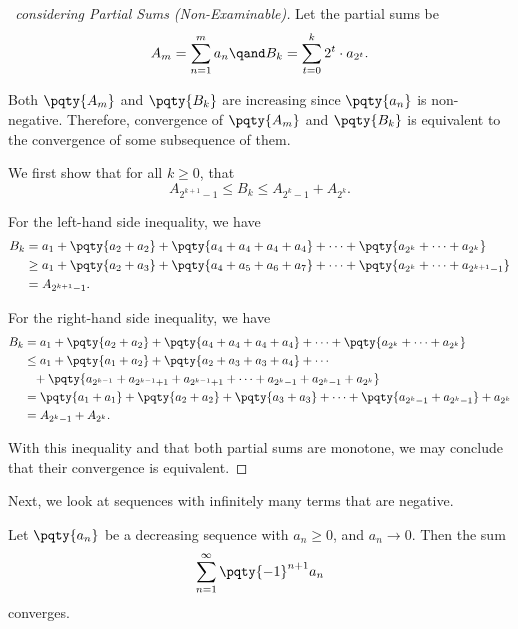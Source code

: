 \begin{proof}[\proofname\ considering Partial Sums (Non-Examinable)]
    Let the partial sums be
        \[
            A_m = \sum_{n = 1}^{m} a_n \qand B_k = \sum_{t = 0}^{k} 2^t \cdot a_{2^t}.
        \]

        Both \(\pqty{A_m}\) and \(\pqty{B_k}\) are increasing since \(\pqty{a_n}\) is non-negative. Therefore, convergence of \(\pqty{A_m}\) and \(\pqty{B_k}\) is equivalent to the convergence of some subsequence of them.

        We first show that for all \(k \geq 0\), that
        \[
            A_{2^{k + 1} - 1} \leq B_{k} \leq A_{2^k - 1} + A_{2^k}.
        \]

        For the left-hand side inequality, we have
        \begin{align*}
            B_k &= a_1 + \pqty{a_2 + a_2} + \pqty{a_4 + a_4 + a_4 + a_4} + \cdots + \pqty{a_{2^k} + \cdots + a_{2^k}} \\
            &\geq a_1 + \pqty{a_2 + a_3} + \pqty{a_4 + a_5 + a_6 + a_7} + \cdots + \pqty{a_{2^k} + \cdots + a_{2^{k + 1} - 1}} \\
            &= A_{2^{k + 1} - 1}.
        \end{align*}

        For the right-hand side inequality, we have
        \begin{align*}
            B_k &= a_1 + \pqty{a_2 + a_2} + \pqty{a_4 + a_4 + a_4 + a_4} + \cdots + \pqty{a_{2^k} + \cdots + a_{2^k}} \\
            &\leq a_1 + \pqty{a_1 + a_2} + \pqty{a_2 + a_3 + a_3 + a_4} + \cdots \\
            &\phantom{=} + \pqty{a_{2^{k - 1}} + a_{2^{k - 1} + 1} + a_{2^{k - 1} + 1} + \cdots  + a_{2^k - 1} + a_{2^k - 1} + a_{2^k}} \\
            &= \pqty{a_1 + a_1} + \pqty{a_2 + a_2} + \pqty{a_3 + a_3} + \cdots + \pqty{a_{2^k - 1} + a_{2^k - 1}} + a_{2^k} \\
            &= A_{2^k - 1} + A_{2^k}.
        \end{align*}

        With this inequality and that both partial sums are monotone, we may conclude that their convergence is equivalent.
\end{proof}

Next, we look at sequences with infinitely many terms that are negative.

\begin{proposition}
    \label{prop:ser-test-alternating}%
    Let \(\pqty{a_n}\) be a decreasing sequence with \(a_n \geq 0\), and \(a_n \to 0\). Then the sum
    \[
        \sum_{n = 1}^{\infty} \pqty{-1}^{n + 1} a_n
    \]  
    converges.
\end{proposition}

